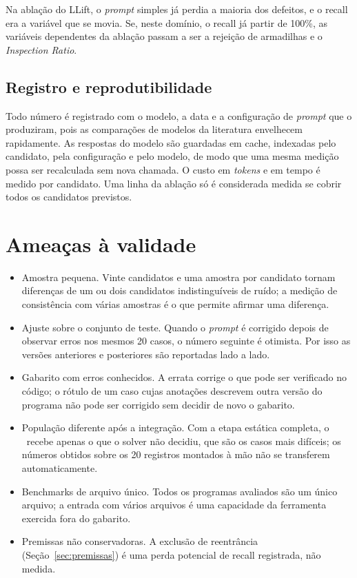 Na ablação do LLift, o \textit{prompt} simples já perdia a maioria dos defeitos,
e o recall era a variável que se movia. Se, neste domínio, o recall já partir de
100\%, as variáveis dependentes da ablação passam a ser a rejeição de armadilhas
e o \textit{Inspection Ratio}.

\subsection{Registro e reprodutibilidade}

Todo número é registrado com o modelo, a data e a configuração de
\textit{prompt} que o produziram, pois as comparações de modelos da literatura
envelhecem rapidamente. As respostas do modelo são guardadas em cache,
indexadas pelo candidato, pela configuração e pelo modelo, de modo que uma
mesma medição possa ser recalculada sem nova chamada. O custo em
\textit{tokens} e em tempo é medido por candidato. Uma linha da ablação só é
considerada medida se cobrir todos os candidatos previstos.

\section{Ameaças à validade}
\label{sec:ameacas}

\begin{itemize}
  \item Amostra pequena. Vinte candidatos e uma amostra por candidato
    tornam diferenças de um ou dois candidatos indistinguíveis de ruído; a
    medição de consistência com várias amostras é o que permite afirmar uma
    diferença.
  \item Ajuste sobre o conjunto de teste. Quando o \textit{prompt} é
    corrigido depois de observar erros nos mesmos 20 casos, o número seguinte é
    otimista. Por isso as versões anteriores e posteriores são reportadas lado a
    lado.
  \item Gabarito com erros conhecidos. A errata corrige o que pode ser
    verificado no código; o rótulo de um caso cujas anotações descrevem outra
    versão do programa não pode ser corrigido sem decidir de novo o gabarito.
  \item População diferente após a integração. Com a etapa estática
    completa, o \llm\ recebe apenas o que o solver não decidiu, que são os casos
    mais difíceis; os números obtidos sobre os 20 registros montados à mão não
    se transferem automaticamente.
  \item Benchmarks de arquivo único. Todos os programas avaliados são um
    único arquivo; a entrada com vários arquivos é uma capacidade da ferramenta
    exercida fora do gabarito.
  \item Premissas não conservadoras. A exclusão de reentrância
    (Seção~\ref{sec:premissas}) é uma perda potencial de recall registrada, não
    medida.
\end{itemize}
